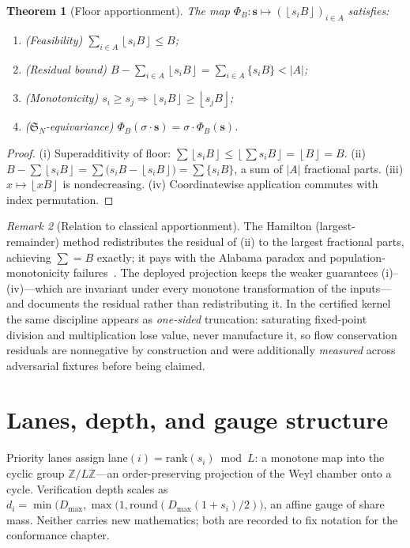 \documentclass[12pt,oneside]{report}
\theoremstyle{plain}
\newtheorem{theorem}{Theorem}[chapter]
\theoremstyle{definition}
\theoremstyle{remark}
\newtheorem{remarkx}[theorem]{Remark}
\newcommand{\Z}{\mathbb{Z}}
\newcommand{\floor}[1]{\left\lfloor #1\right\rfloor}
\newcommand{\sym}{\mathfrak{S}}
\newcommand{\shares}{\mathbf{s}}
\begin{document}
\begin{theorem}[Floor apportionment]
\label{thm:floor}
The map $\Phi_B:\shares\mapsto(\floor{s_iB})_{i\in A}$ satisfies:
\begin{enumerate}
\item[(i)] \emph{(Feasibility)} $\sum_{i\in A}\floor{s_iB}\le B$;
\item[(ii)] \emph{(Residual bound)}
$B-\sum_{i\in A}\floor{s_iB} = \sum_{i\in A}\{s_iB\} < |A|$;
\item[(iii)] \emph{(Monotonicity)} $s_i\ge s_j \Rightarrow
\floor{s_iB}\ge\floor{s_jB}$;
\item[(iv)] \emph{($\sym_N$-equivariance)}
$\Phi_B(\sigma\cdot\shares)=\sigma\cdot\Phi_B(\shares)$.
\end{enumerate}
\end{theorem}

\begin{proof}
(i) Superadditivity of floor:
$\sum\floor{s_iB}\le\floor{\sum s_iB}=\floor{B}=B$.
(ii) $B-\sum\floor{s_iB}=\sum\bigl(s_iB-\floor{s_iB}\bigr)
=\sum\{s_iB\}$, a sum of $|A|$ fractional parts.
(iii) $x\mapsto\floor{xB}$ is nondecreasing.
(iv) Coordinatewise application commutes with index permutation.
\end{proof}

\begin{remarkx}[Relation to classical apportionment]
The Hamilton (largest-remainder) method redistributes the residual of
(ii) to the largest fractional parts, achieving $\sum=B$ exactly; it
pays with the Alabama paradox and population-monotonicity
failures~\cite{balinski1982}. The deployed projection keeps the weaker
guarantees (i)--(iv)---which are invariant under every monotone
transformation of the inputs---and documents the residual rather than
redistributing it. In the certified kernel the same discipline appears
as \emph{one-sided} truncation: saturating fixed-point division and
multiplication lose value, never manufacture it, so flow conservation
residuals are nonnegative by construction and were additionally
\emph{measured} across adversarial fixtures before being claimed.
\end{remarkx}

\section{Lanes, depth, and gauge structure}

Priority lanes assign lane$(i) = \mathrm{rank}(s_i) \bmod L$: a
monotone map into the cyclic group $\Z/L\Z$---an order-preserving
projection of the Weyl chamber onto a cycle. Verification depth scales
as $d_i = \min\bigl(D_{\max},\max(1,\mathrm{round}(D_{\max}(1+s_i)/2)\bigr)$,
an affine gauge of share mass. Neither carries new mathematics; both are
recorded to fix notation for the conformance chapter.
\end{document}
